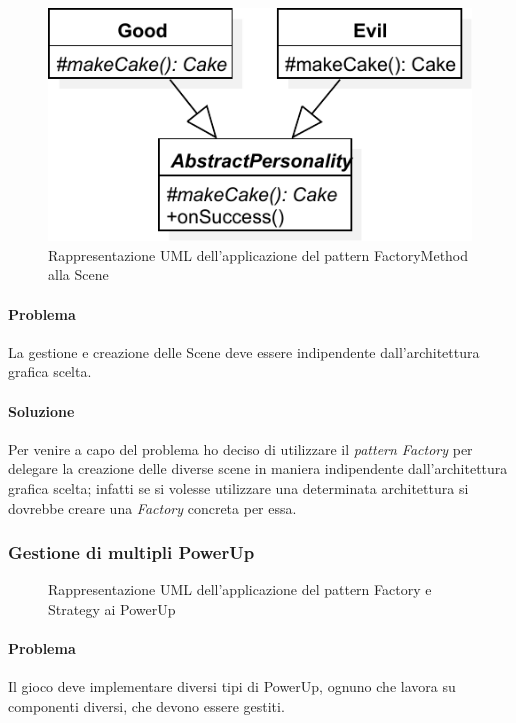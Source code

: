 \documentclass[a4paper,12pt]{report}
\begin{document}
\begin{figure}[H]
\centering{}
\includegraphics[width=\textwidth]{img/template}
\caption{Rappresentazione UML dell'applicazione del pattern FactoryMethod alla Scene}
\label{img:template}
\end{figure}

\paragraph{Problema} La gestione e creazione delle Scene deve essere indipendente dall'architettura grafica scelta.

\paragraph{Soluzione} Per venire a capo del problema ho deciso di utilizzare il \textit{pattern Factory} per delegare la creazione delle diverse scene in maniera indipendente dall'architettura grafica scelta; infatti se si volesse utilizzare una determinata architettura si dovrebbe creare una \textit{Factory} concreta per essa.

\subsubsection{Gestione di multipli PowerUp}

\begin{figure}[H]
\centering{}
\caption{Rappresentazione UML dell'applicazione del pattern Factory e Strategy ai PowerUp}
\label{img:observer}
\end{figure}

\paragraph{Problema} Il gioco deve implementare diversi tipi di PowerUp, ognuno che lavora su componenti diversi, che devono essere gestiti.
\end{document}
